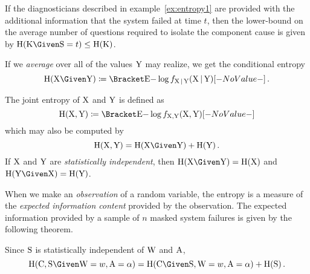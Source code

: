 \documentclass[../main.tex]{subfiles}
\begin{document}
If the diagnosticians described in example~\ref{ex:entropy1} are provided with the additional information that the system failed at time $t$, then the lower-bound on the average number of questions required to isolate the component cause is given by $\entropy(\RV{K} \Given \sv = t) \leq \entropy(\RV{K})$.

If we \emph{average} over all of the values $\mathrm{Y}$ may realize, we get the conditional entropy
\begin{equation}
	\entropy(\RV{X} \Given \RV{Y}) \coloneqq \Expect{-\log \pdf_{\RV{X} \given \RV{Y}}(\RV{X} \given \RV{Y})}\,.
\end{equation}

The joint entropy of $\mathrm{X}$ and $\mathrm{Y}$ is defined as
\begin{equation}
\entropy(\RV{X}, \RV{Y}) \coloneqq \Expect{- \log \pdf_{\RV{X},\RV{Y}}(\RV{X},\RV{Y})}
\end{equation}
which may also be computed by
\begin{equation}
	\entropy(\RV{X},\RV{Y}) = \entropy(\RV{X} \Given \RV{Y}) + \entropy(\RV{Y})\,.
\end{equation}
If $\mathrm{X}$ and $\mathrm{Y}$ are \emph{statistically independent}, then $\entropy(\RV{X} \Given \RV{Y}) = \entropy(\RV{X})$ and $\entropy(\RV{Y} \Given \RV{X}) = \entropy(\RV{Y})$.

When we make an \emph{observation} of a random variable, the entropy is a measure of the \emph{expected information content} provided by the observation.
The expected information provided by a sample of $n$ masked system failures is given by the following theorem.
\begin{theorem}
Since $\mathrm{S}$ is statistically independent of $\mathrm{W}$ and $\mathrm{A}$,
\begin{equation}
	\entropy(\rvcand, \sv \Given \RV{W} = w, \RV{A} = \alpha) = \entropy(\rvcand \Given \sv, \RV{W} = w, \RV{A} = \alpha) + \entropy(\sv)\,.
\end{equation}
\end{theorem}
\end{document}
